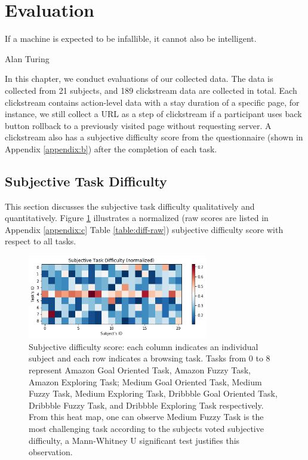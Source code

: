 \section{Evaluation}
\label{ch:eval}

\epigraph{If a machine is expected to be infallible, it cannot also be intelligent.}{Alan Turing}

In this chapter, we conduct evaluations of our collected data.
The data is collected from 21 subjects, and 189 clickstream data are collected in total. 
Each clickstream contains action-level data with a stay duration
of a specific page, for instance, we still collect a URL as a step of clickstream 
if a participant uses back button rollback to a previously visited page
without requesting server. 
A clickstream also has a subjective difficulty score from the questionnaire 
(shown in Appendix \ref{appendix:b}) after the completion of each task.

\subsection{Subjective Task Difficulty}
\label{sec:task-diff}

This section discusses the subjective task difficulty qualitatively and quantitatively.
Figure \ref{fig:difficulty} illustrates a normalized (raw scores are listed in 
Appendix \ref{appendix:c} Table \ref{table:diff-raw}) subjective difficulty score 
with respect to all tasks.

\begin{figure}[H]
    \centering
    \includegraphics[width=0.7\textwidth]{figures/difficulty}
    \caption{Subjective difficulty score: each column indicates an individual subject 
    and each row indicates a browsing task. Tasks from 0 to 8 represent 
    Amazon Goal Oriented Task, Amazon Fuzzy Task, Amazon Exploring Task; 
    Medium Goal Oriented Task, Medium Fuzzy Task, Medium Exploring Task, 
    Dribbble Goal Oriented Task, Dribbble Fuzzy Task, 
    and Dribbble Exploring Task respectively.
    From this heat map, one can observe Medium Fuzzy Task is the most challenging task 
    according to the subjects voted subjective difficulty, 
    a Mann-Whitney U significant test justifies this observation.}
    \label{fig:difficulty}
\end{figure}


